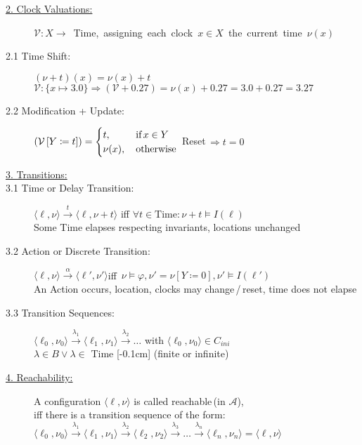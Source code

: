 \begin{tcolorbox}
\begin{description}
\item[\uline{2. Clock Valuations:}] \mbox{$\mathcal{V}: X \rightarrow$ Time, assigning each clock $x \in X$ the current time $\nu(x)$}
\item[2.1 Time Shift:] $(\nu + t)(x) = \nu(x) + t$\\
$\mathcal{V} : \{x \mapsto 3.0\} \Rightarrow (\mathcal{V} + 0.27) = \nu(x) + 0.27 = 3.0 + 0.27 = 3.27$
\item[2.2 Modification + Update:] $\left( \mathcal{V} \left[Y \coloneqq t \right] \right) = \begin{cases}
t, &\text{\,if\,} x \in Y\\
\nu(x), &\text{\,otherwise}
\end{cases}$
\vrule \hfill Reset\,$\Rightarrow t = 0$
\vspace{-0.2cm}
\item[\uline{3. Transitions:}]
\item[3.1 Time or Delay Transition:] $\langle \ell, \nu \rangle \xrightarrow{t} \langle \ell, \nu + t \rangle$ \hfill iff $\forall t \in \text{Time} : \nu + t \models I(\ell)$\\
Some Time elapses respecting invariants, locations unchanged
\item[3.2 Action or Discrete Transition:] \mbox{$\langle \ell, \nu \rangle \xrightarrow{\alpha} \langle \ell', \nu' \rangle$\hfill iff $\nu \models \varphi, \nu' = \nu \left[ Y \coloneqq 0 \right], \nu' \models I(\ell')$}\\
An Action occurs, location, clocks may change\,/\,reset, time does not elapse
\item[3.3 Transition Sequences:] $\langle \ell_0, \nu_0 \rangle \xrightarrow{\lambda_1} \langle \ell_1, \nu_1 \rangle \xrightarrow{\lambda_2} \ldots $ with $\langle \ell_0, \nu_0 \rangle \in C_{ini}$\\
$\lambda \in B \lor \lambda \in$ Time [-0.1cm] (finite or infinite)\\
\item[\uline{4. Reachability:}] A configuration $\langle \ell, \nu \rangle$ is called reachable\,(in $\mathcal{A}$),\\
iff there is a transition sequence of the form:\\
$\langle \ell_0, \nu_0 \rangle \xrightarrow{\lambda_1} \langle \ell_1, \nu_1 \rangle \xrightarrow{\lambda_2} \langle \ell_2, \nu_2 \rangle \xrightarrow{\lambda_3} \ldots \xrightarrow{\lambda_n} \langle \ell_n, \nu_n \rangle = \langle \ell, \nu \rangle$\\[-0.1cm]


\end{description}
\end{tcolorbox}

